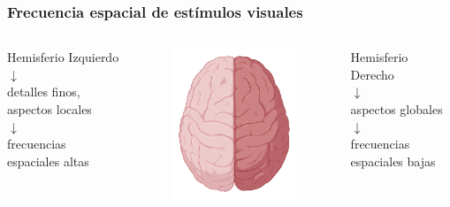 \documentclass[
11pt, %
%
aspectratio=169, %
]{beamer}
\begin{document}
	\begin{frame}
		\frametitle{Frecuencia espacial de est\'imulos visuales}
		
		\begin{columns}[c] %
			\begin{column}{0.3\textwidth} %
				\centering
				Hemisferio Izquierdo\\
				$\downarrow$\\
				detalles finos, aspectos locales\\
				$\downarrow$\\
				frecuencias espaciales altas
				
				
			\end{column}
			
			\begin{column}{0.3\textwidth}
				\begin{figure}
					\centering
					\includegraphics[scale=0.7]{Graphics/brain}
				\end{figure}
			\end{column}
			
			\begin{column}{0.3\textwidth} %
				\centering
				Hemisferio Derecho\\				
				$\downarrow$\\
				aspectos globales\\
				$\downarrow$\\
				frecuencias espaciales bajas
				
				
			\end{column}
		\end{columns}
		
	
		
		
	\end{frame}
\end{document}
